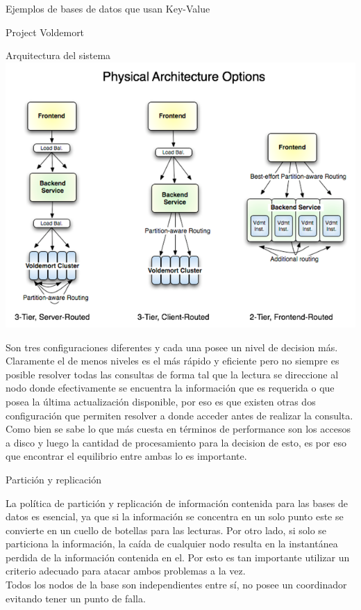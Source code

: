 \begin{section}{Ejemplos de bases de datos que usan Key-Value}
\begin{subsection}{Project Voldemort}
\begin{subsubsection}{Arquitectura del sistema}
\includegraphics[scale=1]{imgs/voldemort}

Son tres configuraciones diferentes y cada una posee un nivel de decision más. Claramente el de menos niveles es el más rápido y eficiente pero no siempre es posible resolver todas las consultas de forma tal que la lectura se direccione al nodo donde efectivamente se encuentra la información que es requerida o que posea la última actualización disponible, por eso es que existen otras dos configuración que permiten resolver a donde acceder antes de realizar la consulta. Como bien se sabe lo que más cuesta en términos de performance son los accesos a disco y luego la cantidad de procesamiento para la decision de esto, es por eso que encontrar el equilibrio entre ambas lo es importante.\\

\end{subsubsection}

\begin{subsubsection}{Partición y replicación}

La política de partición y replicación de información contenida para las bases de datos es esencial, ya que si la información se concentra en un solo punto este se convierte en un cuello de botellas para las lecturas. Por otro lado, si solo se particiona la información, la caída de cualquier nodo resulta en la instantánea perdida de la información contenida en el. Por esto es tan importante utilizar un criterio adecuado para atacar ambos problemas a la vez.\\

Todos los nodos de la base son independientes entre sí, no posee un coordinador evitando tener un punto de falla.\\


\end{subsubsection}
\end{subsection}
\end{section}
